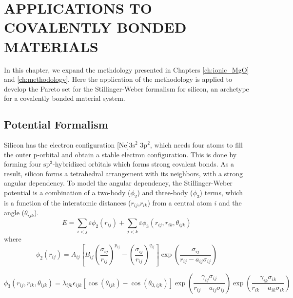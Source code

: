 \chapter{APPLICATIONS TO COVALENTLY BONDED MATERIALS}
\label{ch:pareto_si}

In this chapter, we expand the methdology presented in Chapters \ref{ch:ionic_MgO} and \ref{ch:methodology}.  Here the application of the methodology is applied to develop the Pareto set for the Stillinger-Weber formalism\cite{stillinger1985_sw} for silicon, an archetype for a covalently bonded material system.

\section{Potential Formalism}
Silicon has the electron configuration [Ne]$\text{3s}^2$ $\text{3p}^2$, which needs four atoms to fill the outer p-orbital and obtain a stable electron configuration.  This is done by forming four $\text{sp}^3$-hybridized orbitals which forms strong covalent bonds.  As a result, silicon forms a tetrahedral arrangement with its neighbors, with a strong angular dependency.  To model the angular dependency, the Stillinger-Weber potential\cite{stillinger1985_sw} is a combination of a two-body ($\phi_2$) and three-body ($\phi_3$) terms, which is a function of the interatomic distances ($r_{ij}$,$r_{ik}$) from a central atom $i$ and the angle ($\theta_{ijk}$).
\begin{equation}
    E = \sum_{i<j}\varepsilon \phi_2 (r_{ij})
        +\sum_{j<k}\varepsilon \phi_3 (r_{ij},r_{ik},\theta_{ijk})
\end{equation}
where
\begin{equation}
    \phi_2(r_{ij})=A_{ij} \left[
        B_{ij}
        \left(\frac{\sigma_{ij}}{r_{ij}}\right)^{p_{ij}}
        - \left(\frac{\sigma_{ij}}{r_{ij}}\right)^{q_{ij}}
    \right]
    \exp\left(\frac{\sigma_{ij}}{r_{ij}-a_{ij}\sigma_{ij}}\right)
\end{equation}

\begin{equation}
    \phi_3(r_{ij},r_{ik},\theta_{ijk}) =
        \lambda_{ijk}
        \epsilon_{ijk}
        \left[
            \cos(\theta_{ijk}) - \cos(\theta_{0,ijk})
        \right]
        \exp\left(\frac{\gamma_{ij}\sigma_{ij}}
                       {r_{ij}-a_{ij}\sigma_{ij}}
            \right)
        \exp\left(\frac{\gamma_{ik}\sigma_{ik}}
                       {r_{ik}-a_{ik}\sigma_{ik}}
            \right)
\end{equation}

